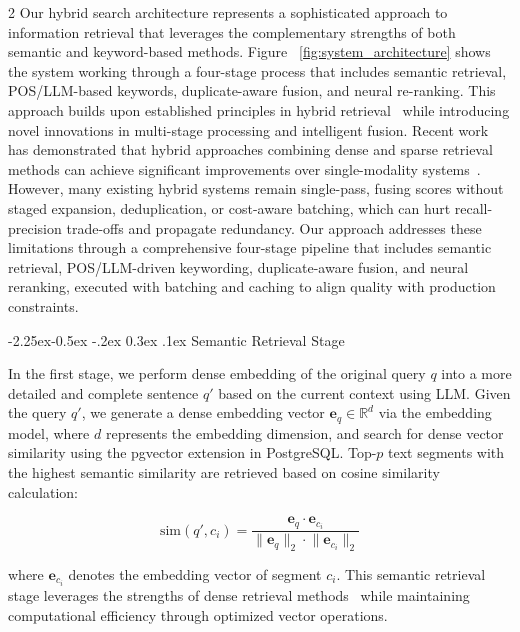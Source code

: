 \documentclass[10pt,letterpaper]{article}
\makeatletter
\let\cite\citep
\renewcommand{\subsubsection}{\@startsection{subsubsection}{3}{\z@}%
                                     {-2.25ex\@plus -0.5ex \@minus -.2ex}%
                                     {0.3ex \@plus .1ex}%
                                     {\normalfont\normalsize\itshape}}
\makeatother
\begin{document}
\begin{multicols}{2}
Our hybrid search architecture represents a sophisticated approach to information retrieval that leverages the complementary strengths of both semantic and keyword-based methods. Figure ~\ref{fig:system_architecture} shows the system working through a four-stage process that includes semantic retrieval, POS/LLM-based keywords, duplicate-aware fusion, and neural re-ranking. This approach builds upon established principles in hybrid retrieval~\cite{gao2021retrieval} while introducing novel innovations in multi-stage processing and intelligent fusion. Recent work has demonstrated that hybrid approaches combining dense and sparse retrieval methods can achieve significant improvements over single-modality systems~\cite{karpukhin2020dpr,robertson2009bm25}. However, many existing hybrid systems remain single-pass, fusing scores without staged expansion, deduplication, or cost-aware batching, which can hurt recall-precision trade-offs and propagate redundancy. Our approach addresses these limitations through a comprehensive four-stage pipeline that includes semantic retrieval, POS/LLM-driven keywording, duplicate-aware fusion, and neural reranking, executed with batching and caching to align quality with production constraints.

\subsubsection{Semantic Retrieval Stage}

In the first stage, we perform dense embedding of the original query $q$ into a more detailed and complete sentence $q'$ based on the current context using LLM. Given the query $q'$, we generate a dense embedding vector $\mathbf{e}_q \in \mathbb{R}^d$ via the embedding model, where $d$ represents the embedding dimension, and search for dense vector similarity using the pgvector extension in PostgreSQL. Top-$p$ text segments with the highest semantic similarity are retrieved based on cosine similarity calculation:

\begin{equation}
\text{sim}(q', c_i) = \frac{\mathbf{e}_q \cdot \mathbf{e}_{c_i}}{\lVert \mathbf{e}_q\rVert_2 \cdot \lVert\mathbf{e}_{c_i}\rVert_2}
\end{equation}

where $\mathbf{e}_{c_i}$ denotes the embedding vector of segment $c_i$. This semantic retrieval stage leverages the strengths of dense retrieval methods~\cite{karpukhin2020dpr,izacard2021contriever} while maintaining computational efficiency through optimized vector operations.


\end{multicols}
\end{document}
